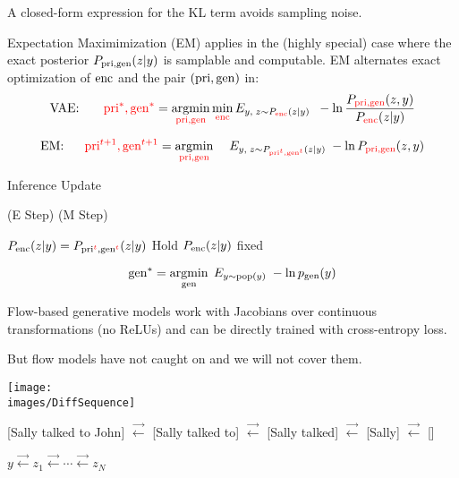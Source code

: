 {\vfill
A closed-form expression for the KL term avoids sampling noise.


Expectation Maximimization (EM) applies in the (highly special) case where the exact posterior $P_{\mathrm{pri},\mathrm{gen}}(z|y)$ is samplable and computable.
EM alternates exact optimization of $\mathrm{enc}$ and the pair $(\mathrm{pri},\mathrm{gen})$ in:
$$\mbox{VAE:}\;\;\;\;\;\;\; {\color{red} \mathrm{pri}^*,\mathrm{gen}^*} = \operatorname*{argmin}_{\color{red} \mathrm{pri},\mathrm{gen}} \min_{\color{red} \mathrm{enc}} E_{y,\;z \sim P_{\color{red} \mathrm{enc}}(z|y)}\;\;- \ln \frac{P_{\color{red} \mathrm{pri},\mathrm{gen}}(z,y)}{P_{\color{red} \mathrm{enc}}(z|y)}$$

\vfill
$$\mbox{EM:}\;\;\;\;\;\; {\color{red} \mathrm{pri}^{t+1},\mathrm{gen}^{t+1}} =  \operatorname*{argmin}_{\color{red} \mathrm{pri},\mathrm{gen}}\;\;\;\;E_{y,\;z \sim P_{\color{red} \mathrm{pri}^t,\mathrm{gen}^t}(z|y)}\; - \ln P_{\color{red} \mathrm{pri},\mathrm{gen}}(z,y)$$

\vfill
\centerline{\hspace{1em} Inference \hspace{6em} Update \hspace{2.5em}~}
\centerline{(E Step) \hspace{6em} (M Step) ~}
\centerline{ $P_{\mathrm{enc}}(z|y) = P_{\mathrm{pri}^{\color{red} t},\mathrm{gen}^{\color{red} t}}(z|y)$ \hspace{2.5em} Hold $P_{\mathrm{enc}}(z|y)$ fixed \hspace{0em}~}

$$\mathrm{gen}^* = \operatorname*{argmin}_{\mathrm{gen}} \;E_{y \sim \mathrm{pop}(y)}\;-\ln p_{\mathrm{gen}}(y)$$

\vfill
Flow-based generative models work with Jacobians over continuous transformations (no ReLUs)
and can be directly trained with cross-entropy loss.

\vfill
But flow models have not caught on and we will not cover them.



\centerline{\texttt{[image: \\images/DiffSequence]}}

\vfill
{\huge
\centerline{{\color{red} [Sally talked to John]} $\stackrel{\rightarrow}{\leftarrow}$ {\color{red} [Sally talked to]}
$\stackrel{\rightarrow}{\leftarrow}$ {\color{red}[Sally talked]} $\stackrel{\rightarrow}{\leftarrow}$ {\color{red}[Sally]} $\stackrel{\rightarrow}{\leftarrow}$ {\color{red} []}}
}

\vfill
\centerline{$y \stackrel{\rightarrow}{\leftarrow} z_1  \stackrel{\rightarrow}{\leftarrow} \cdots \stackrel{\rightarrow}{\leftarrow} z_N$}

}
